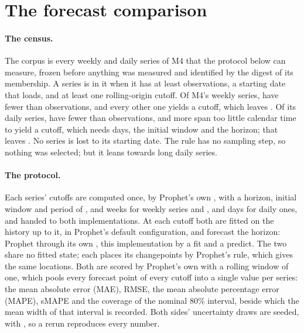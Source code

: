 \section{The forecast comparison}
\label{app:forecast}

\paragraph{The census.}
The corpus is every weekly and daily series of M4 \citep{makridakis2020m4} that the
protocol below can measure, frozen before anything was measured and identified by the
digest \texttt{\CensusDigest} of its membership. A series is in it when it has at least
\CensusMinLength{} observations, a starting date that loads, and at least one
rolling-origin cutoff. Of M4's \CensusWeeklyMfour{} weekly series, \CensusWeeklyShort{}
have fewer than \CensusMinLength{} observations, and every other one yields a cutoff,
which leaves \CensusWeekly. Of its \CensusDailyMfour{} daily series,
\CensusDailyShort{} have fewer than \CensusMinLength{} observations, and
\CensusDailyNoCutoff{} more span too little calendar time to yield a cutoff, which
needs \CensusDailySpan{} days, the initial window and the horizon; that leaves
\CensusDaily. No series is lost to its starting date. The rule has no sampling step, so
nothing was selected; but it leans towards long daily series.

\paragraph{The protocol.}
Each series' cutoffs are computed once, by Prophet's own , with a
horizon, initial window and period of \CensusWeeklyHorizon, \CensusWeeklyInitial{} and
\CensusWeeklyPeriod{} weeks for weekly series and \CensusDailyHorizon,
\CensusDailyInitial{} and \CensusDailyPeriod{} days for daily ones, and handed to both
implementations. At each cutoff both are fitted on the history up to it, in Prophet's
default configuration, and forecast the horizon: Prophet through its own
, this implementation by a fit and a predict. The two share no
fitted state; each places its changepoints by Prophet's rule, which gives the same
locations. Both are scored by Prophet's own  with a rolling
window of one, which pools every forecast point of every cutoff into a single value per
series: the mean absolute error (MAE), RMSE, the mean absolute percentage error
(MAPE), sMAPE and the coverage of the nominal 80\% interval, beside
which the mean width of that interval is recorded. Both sides' uncertainty draws are
seeded, with \CensusSeed, so a rerun reproduces every number.

